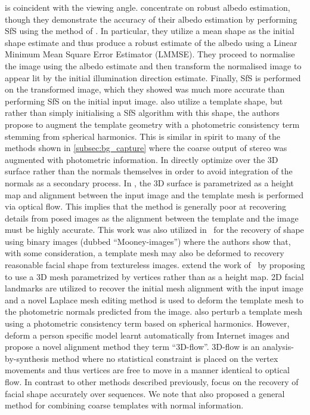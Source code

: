 is coincident with the viewing angle.
\citet{biswas2009robust} concentrate on robust albedo estimation, though they
demonstrate the accuracy of their albedo estimation by performing SfS using the
method of \citet{ping1994shape}. In particular, they utilize a mean shape as the
initial shape estimate and thus produce a robust estimate of the albedo using a
Linear Minimum Mean Square Error Estimator (LMMSE). They proceed to normalise
the image using the albedo estimate and then transform the normalised image to
appear lit by the initial illumination direction estimate. Finally, SfS is
performed on the transformed image, which they showed was much more accurate
than performing SfS on the initial input image.
\citet{KemelmacherShlizerman:in} also utilize a template shape, but rather
than simply initialising a SfS algorithm with this shape, the authors propose to
augment the template geometry with a photometric consistency term stemming from
spherical harmonics. This is similar in spirit to many of the methods shown in
\cref{subsec:bg_capture} where the coarse output of stereo was augmented with
photometric information. In \citet{KemelmacherShlizerman:in} directly optimize
over the 3D surface rather than the normals themselves in order to avoid
integration of the normals as a secondary process. In
\citet{KemelmacherShlizerman:in}, the 3D surface is parametrized as a height map
and alignment between the input image and the template mesh is performed via
optical flow. This implies that the method is generally poor at recovering
details from posed images as the alignment between the template and the image
must be highly accurate. This work was also utilized
in~\cite{kemelmacher2008mooney} for the recovery of shape using binary
images (dubbed ``Mooney-images'') where the authors show that, with some
consideration, a template mesh may also be deformed to recovery reasonable
facial shape from textureless images.
\citet{roth2015unconstrained} extend the work of~\cite{KemelmacherShlizerman:in}
by proposing to use a 3D mesh parametrized by vertices rather than as a height
map. 2D facial landmarks are utilized to recover the initial mesh alignment with
the input image and a novel Laplace mesh editing method is used to deform the
template mesh to the photometric normals predicted from the image.
\citet{Suwajanakorn:2014bl} also perturb a template mesh using a photometric
consistency term based on spherical harmonics.
However, \citet{Suwajanakorn:2014bl} deform a person
specific model learnt automatically from Internet images and propose a novel
alignment method they term ``3D-flow''. 3D-flow is an analysis-by-synthesis
method where no statistical constraint is placed on the vertex movements
and thus vertices are free to move in a manner identical to optical flow. In
contrast to other methods described previously, \citet{Suwajanakorn:2014bl}
focus on the recovery of facial shape accurately over sequences.
We note that \citet{nehab2005efficiently} also proposed a general method
for combining coarse templates with normal information.

